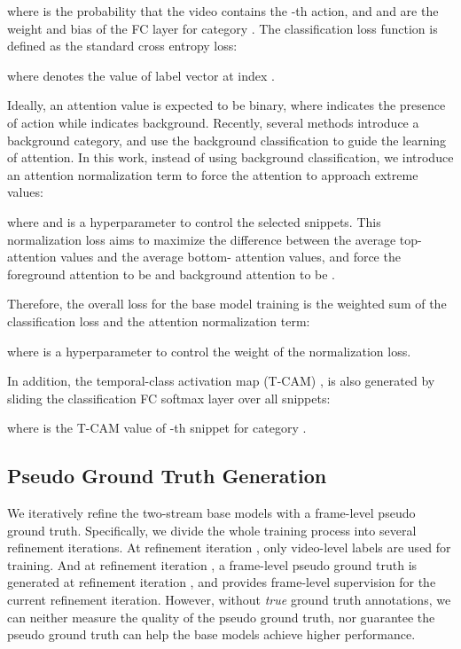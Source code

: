 \documentclass[runningheads]{llncs}
\begin{document}
where  is the probability that the video contains the -th action, and  and  are the weight and bias of the FC layer for category . The classification loss function  is defined as the standard cross entropy loss:

where  denotes the value of label vector  at index .

Ideally, an attention value is expected to be binary, where  indicates the presence of action while  indicates background. Recently, several methods \cite{nguyen2019weakly,lee2020background} introduce a background category, and use the background classification to guide the learning of attention. In this work, instead of using background classification, we introduce an attention normalization term to force the attention to approach extreme values:

where  and  is a hyperparameter to control the selected snippets. This normalization loss aims to maximize the difference between the average top- attention values and the average bottom- attention values, and force the foreground attention to be  and background attention to be . 

Therefore, the overall loss for the base model training is the weighted sum of the classification loss and the attention normalization term:

where  is a hyperparameter to control the weight of the normalization loss.

In addition, the temporal-class activation map (T-CAM) ,  is also generated by sliding the classification FC softmax layer over all snippets: 

where  is the T-CAM value of -th snippet for category .


\subsection{Pseudo Ground Truth Generation}
We iteratively refine the two-stream base models with a frame-level pseudo ground truth. 
Specifically, we divide the whole training process into several refinement iterations. 
At refinement iteration , only video-level labels are used for training.
And at refinement iteration , a frame-level pseudo ground truth is generated at refinement iteration , and provides frame-level supervision for the current refinement iteration. 
However, without \textit{true} ground truth annotations, we can neither measure the quality of the pseudo ground truth, nor guarantee the pseudo ground truth can help the base models achieve higher performance.
\end{document}

